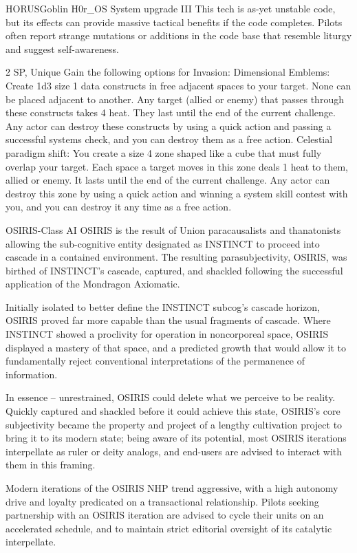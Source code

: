\begin{mech}{HORUS}{Goblin}
H0r\_OS System upgrade III
This tech is as-yet unstable code, but its effects can provide massive tactical benefits if the code completes. Pilots often report strange mutations or additions in the code base that resemble liturgy and suggest self-awareness.

2 SP, Unique
Gain the following options for Invasion:
Dimensional Emblems: Create 1d3 size 1 data constructs in free adjacent spaces to your target. None can be placed adjacent to another. Any target (allied or enemy) that passes through these constructs takes 4 heat. They last until the end of the current challenge. Any actor can destroy these constructs by using a quick action and passing a successful systems check, and you can destroy them as a free action.
Celestial paradigm shift: You create a size 4 zone shaped like a cube that must fully overlap your target. Each space a target moves in this zone deals 1 heat to them, allied or enemy. It lasts until the end of the current challenge. Any actor can destroy this zone by using a quick action and winning a system skill contest with you, and you can destroy it any time as a free action.

OSIRIS-Class AI
OSIRIS is the result of Union paracausalists and thanatonists allowing the sub-cognitive entity designated as INSTINCT to proceed into cascade in a contained environment. The resulting parasubjectivity, OSIRIS, was birthed of INSTINCT's cascade, captured, and shackled following the successful application of the Mondragon Axiomatic.

Initially isolated to better define the INSTINCT subcog's cascade horizon, OSIRIS proved far more capable than the usual fragments of cascade. Where INSTINCT showed a proclivity for operation in noncorporeal space, OSIRIS displayed a mastery of that space, and a predicted growth that would allow it to fundamentally reject conventional interpretations of the permanence of information.

In essence -- unrestrained, OSIRIS could delete what we perceive to be reality. Quickly captured and shackled before it could achieve this state, OSIRIS's core subjectivity became the property and project of a lengthy cultivation project to bring it to its modern state; being aware of its potential, most OSIRIS iterations interpellate as ruler or deity analogs, and end-users are advised to interact with them in this framing.

Modern iterations of the OSIRIS NHP trend aggressive, with a high autonomy drive and loyalty predicated on a transactional relationship. Pilots seeking partnership with an OSIRIS iteration are advised to cycle their units on an accelerated schedule, and to maintain strict editorial oversight of its catalytic interpellate.


\end{mech}
